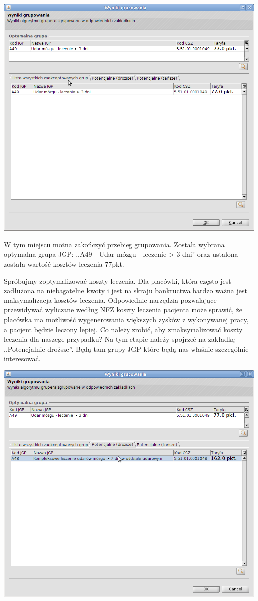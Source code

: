 \includegraphics[scale=0.4]{images/gruper9}

W tym miejscu można zakończyć przebieg grupowania. Została wybrana optymalna grupa JGP: ,,A49 - Udar mózgu - leczenie > 3 dni'' oraz ustalona została wartość kosztów leczenia 77pkt.

Spróbujmy zoptymalizować koszty leczenia. Dla placówki, która często jest zadłużona na niebagatelne kwoty i jest na skraju bankructwa bardzo ważna jest maksymalizacja kosztów leczenia. Odpowiednie narzędzia pozwalające przewidywać wyliczane według NFZ koszty leczenia pacjenta może sprawić, że placówka ma możliwość wygenerowania większych zysków z wykonywanej pracy, a pacjent będzie leczony lepiej. Co należy zrobić, aby zmaksymalizować koszty leczenia dla naszego przypadku? Na tym etapie należy spojrzeć na zakładkę ,,Potencjalnie droższe''. Będą tam grupy JGP które będą nas właśnie szczególnie interesować.

\includegraphics[scale=0.4]{images/gruper10}

